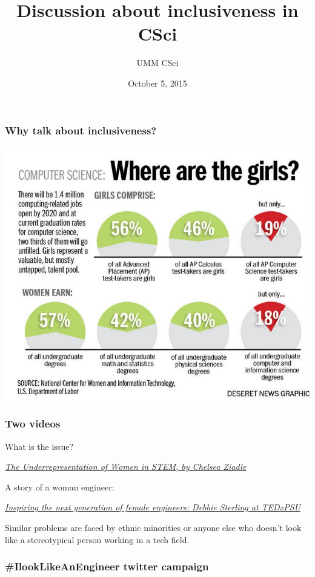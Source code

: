 \documentclass{beamer}
\begin{document}
\title{Discussion about inclusiveness in CSci}
\author{UMM CSci}
\date{October 5, 2015}

\begin{frame}
\maketitle
\end{frame}

\begin{frame}
\frametitle{Why talk about inclusiveness?}
\includegraphics[scale=0.5]{Stats.jpg}
\end{frame}

\begin{frame}
\frametitle{Two videos}
What is the issue? 

{\it 
\href{https://www.youtube.com/watch?v=fQyCBTDproE}{The Underrepresentation of Women in STEM, by Chelsea Ziadle}}

A story of a woman engineer:

{\it
\href{https://www.youtube.com/watch?v=FEeTLopLkEo}{Inspiring the next generation of female engineers: Debbie Sterling at TEDxPSU}}

Similar problems are faced by ethnic minorities or anyone else who doesn't look like a stereotypical  person working in a tech field. 
\end{frame}

\begin{frame}
\frametitle{\#IlookLikeAnEngineer twitter campaign}

\end{frame}
\end{document}
